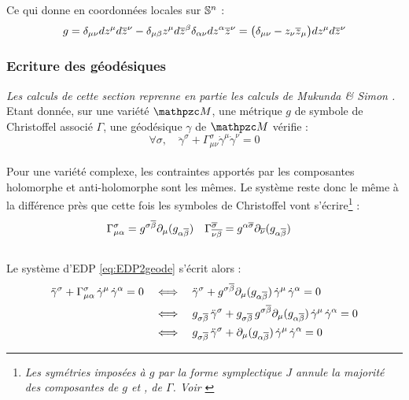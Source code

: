 Ce qui donne en coordonnées locales sur $\S{n}$ : 
\[g = \delta_{\mu \nu} dz^\mu d\congu{z}^\nu - \delta_{\mu \beta}z^\mu d\congu{z}^\beta \delta_{\alpha \nu} dz^\alpha \congu{z}^\nu = \big( \delta_{\mu \nu} - z_\nu \congu{z}_\mu \big) dz^\mu d\congu{z}^\nu\]
\skipl



\subsubsection{Ecriture des géodésiques}

\textit{Les calculs de cette section reprenne en partie les calculs de Mukunda \& Simon \cite[sec. 4, p. 219]{mukunda_quantum_1993}.}
\\

Etant donnée, sur une variété $\manu$, une métrique $g$ de symbole de Christoffel associé $\Gamma$, une géodésique $\gamma$ de $\manu$ vérifie \cite{do_carmo_riemannian_1992} :
\begin{equation}\label{eq:EDP2geode}
	\forall \sigma,\quad \ddot{\gamma}^\sigma + \Gamma^\sigma _{\mu \nu} \dot{\gamma}^\mu \dot{\gamma}^\nu = 0
\end{equation}
\\
Pour une variété complexe, les contraintes apportés par les composantes holomorphe  et anti-holomorphe  sont les mêmes. Le système reste donc le même à la différence près que cette fois les symboles de Christoffel vont s'écrire\footnote{\itshape
	Les symétries imposées à $g$ par la forme symplectique $J$ annule la majorité des composantes de $g$ et \afortiori, de $\Gamma$. Voir \cite[sec. 8.4.3]{nakahara_geometry_2003}
} :
\begin{align}\label{eq:symb2Christo}
	\Gamma^\sigma _{\mu \alpha} &= g^{\sigma \congu{\beta}} \partial_{\mu} (g_{\alpha \congu{\beta}})  &  \Gamma^{\congu{\sigma}} _{\congu{\nu \beta}} &= g^{\alpha \congu{\sigma}} \partial_{\congu{\nu}} (g_{\alpha \congu{\beta}}) 
\end{align}
\\
Le système d'EDP \eqref{eq:EDP2geode} s'écrit alors :
\begin{align*}
	\ddot{\gamma}^\sigma + \Gamma^\sigma _{\mu \alpha}\,  \dot{\gamma}^\mu\, \dot{\gamma}^\alpha = 0 
	\quad &\Llr\quad
	\ddot{\gamma}^\sigma + g^{\sigma \congu{\beta}} \partial_{\mu} (g_{\alpha \congu{\beta}}) \, \dot{\gamma}^\mu\, \dot{\gamma}^\alpha = 0 \\
	&\Llr\quad 
	g_{\sigma \congu{\beta}}\, \ddot{\gamma}^\sigma + g_{\sigma \congu{\beta}}\, g^{\sigma \congu{\beta}} \partial_{\mu} (g_{\alpha \congu{\beta}}) \, \dot{\gamma}^\mu\, \dot{\gamma}^\alpha = 0 \\
	&\Llr\quad 
	g_{\sigma \congu{\beta}}\, \ddot{\gamma}^\sigma + \partial_{\mu} (g_{\alpha \congu{\beta}}) \, \dot{\gamma}^\mu\, \dot{\gamma}^\alpha = 0
\end{align*}
